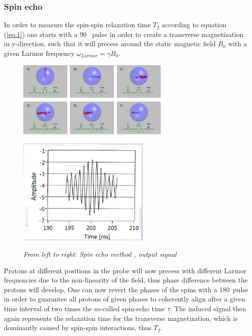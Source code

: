 \subsubsection{Spin echo} 
\label{sec:1} In order to measure the spin-spin relaxation time $T_2$ according to equation (\ref{eq:1}) one starts with a 90 \textdegree\, pulse in order to create a transverse magnetization in y-direction, such that it will precess around the static magnetic field $B_0$ with a given Larmor frequency $\omega_{Larmor} = \gamma B_0$.
\begin{figure}[h]
	\includegraphics[width=75mm
	]{Spinecho}
	\includegraphics[width=65mm]{Spinecho2}
	\centering
	\caption{\itshape From left to right: Spin echo method \cite{Spinecho}, output signal}
	\label{fig:1}
\end{figure}
\newpage
\noindent
 Protons at different positions in the probe will now precess with different Larmor frequencies due to the non-linearity of the field, thus phase difference between the protons will develop.
One can now revert the phases of the spins with a 180\textdegree\, pulse in order to guarantee all protons of given phases to coherently align after a given time interval of two times the so-called spin-echo time $\tau$. The induced signal then again represents the relaxation time for the transverse magnetization, which is dominantly caused by spin-spin interactions, thus $T_2$. \cite{manual} \cite{MRI}

 

